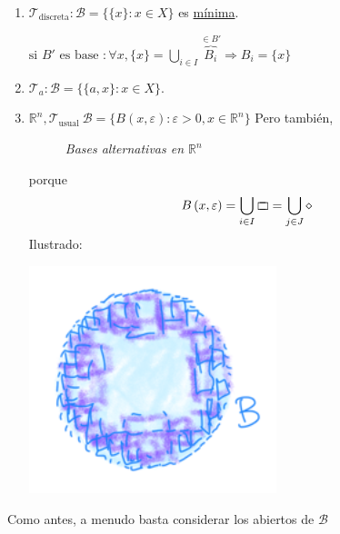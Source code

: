 \begin{ej}
\begin{enumerate}
    \item $\mathcal{T}_{\text{discreta}} : \mathcal{B} = \{\{x\} : x \in X\}$ es \underline{mínima}. 
    \begin{demo}
        $\text{si } B' \text{ es base } : \forall x, \{x\} = \bigcup_{i \in  I} \overbrace{B_i}^{\in B'} \Rightarrow B_i = \{x\}$ 
    \end{demo}
    \item $\mathcal{T}_a: \mathcal{B} = \{\{a, x\} : x \in X\}$.
    \item $\mathbb{R}^n, \mathcal{T}_{\text{usual}}\ \mathcal{B} = \{B\left( x, \varepsilon \right) : \varepsilon > 0, x \in \mathbb{R}^n\}$
    Pero también,
\begin{figure}[H]
    \centering
    \caption{\textit{Bases alternativas en $\mathbb{R}^n$}}
    \label{fig:bases-alternativas-en-rn}
\end{figure}
    porque
    \[
    B\left( x, \varepsilon \right) = \bigcup_{i \in  I} \ooalign{$\sqsubset\mkern3mu$\cr$\mkern3mu\sqsupset$\cr} = \bigcup_{j \in J} \diamond
    \]
Ilustrado:
    \begin{center}
        \includegraphics[scale=0.3]{images/base_rn} 
    \end{center}
\end{enumerate}

\end{ej}

\begin{pg}
    Como antes, a menudo basta considerar los abiertos de $\mathcal{B}$ 
\end{pg}

